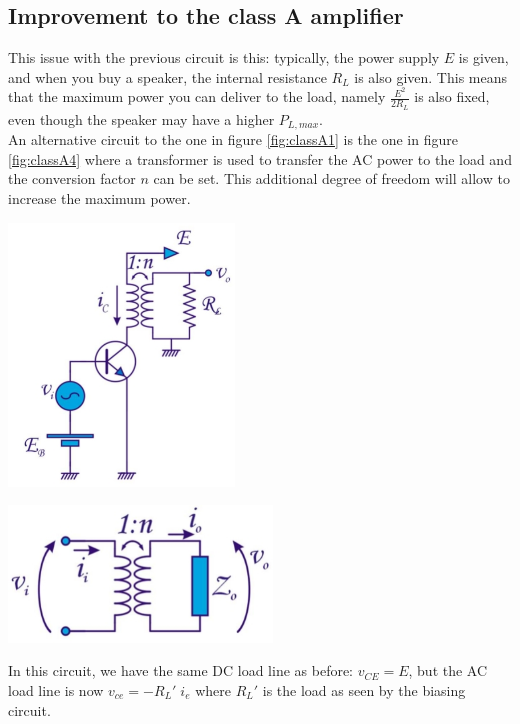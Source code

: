 \subsection{Improvement to the class A amplifier}
This issue with the previous circuit is this: typically, the power supply $E$ is given, and when you buy a speaker, the internal resistance $R_L$ is also given. This means that the maximum power you can deliver to the load, namely $\frac{E^2}{2R_L}$ is also fixed, even though the speaker may have a higher $P_{L, max}$.\\
An alternative circuit to the one in figure \ref{fig:classA1} is the one in figure \ref{fig:classA4} where a transformer is used to transfer the AC power to the load and the conversion factor $n$ can be set. This additional degree of freedom will allow to increase the maximum power.\\
\begin{minipage}{.5\textwidth}
	\centering
	\includegraphics[width=6cm]{figures/ch09/classA4.jpg}
	\label{fig:classA4}
\end{minipage}%
\begin{minipage}{.5\textwidth}
	\centering
	\includegraphics[width=7cm]{figures/ch09/classA5.jpg}
	\label{fig:classA5}
\end{minipage}
In this circuit, we have the same DC load line as before: $v_{CE} = E$, but the AC load line is now $v_{ce} = -R_L' \; i_e$ where $R_L'$ is the load as seen by the biasing circuit.\\
